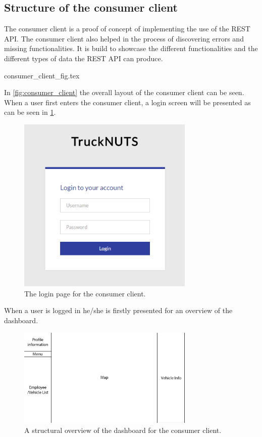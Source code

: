 \subsection{Structure of the consumer client}\label{ssec:consumer_client_structure}
The consumer client is a proof of concept of implementing the use of the REST API.
The consumer client also helped in the process of discovering errors and missing functionalities.
It is build to showcase the different functionalities and the different types of data the REST API can produce.

{consumer_client_fig.tex}

In \cref{fig:consumer_client} the overall layout of the consumer client can be seen.
When a user first enters the consumer client, a login screen will be presented as can be seen in \cref{fig:ConsumerClientLogin}.
\begin{figure}[h]
    \centering
    \includegraphics[width=0.75\textwidth]{img/ConsumerClientLogin.png}
    \caption{The login page for the consumer client.}
    \label{fig:ConsumerClientLogin}
\end{figure}

\bigskip
When a user is logged in he/she is firstly presented for an overview of the dashboard.

\begin{figure}[h]
    \centering
    \includegraphics[width=0.75\textwidth]{img/ConsumerClientWText.png}
    \caption{A structural overview of the dashboard for the consumer client.}
    \label{fig:ConsumerClientLayout}
\end{figure}

